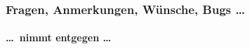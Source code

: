 \begin{frame}
\frametitle{Fragen, Anmerkungen, Wünsche, Bugs \dots}
\framesubtitle{\dots\ nimmt entgegen \dots}

\begin{center}
\end{center}
\end{frame}
